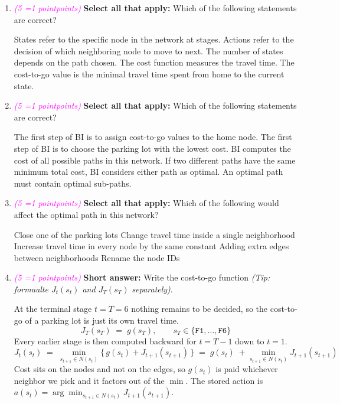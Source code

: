 \documentclass[11pt, letter, answers]{exam}
\newcommand{\grade}[1]{
    \small\textcolor{magenta}{\emph{(#1 \ifnum#1=1 point\else points\fi)}}%
    \normalsize
}
\newcommand{\sAll}{\textbf{Select all that apply: }}
\newcommand{\saq}{\textbf{Short answer: }}
\begin{document}
\begin{enumerate}[label=(\alph*)]

\item \grade{5} \sAll Which of the following statements are correct?
{
\checkboxchar{$\Box$} \checkedchar{$\blacksquare$}  %
\begin{checkboxes}
    \CorrectChoice States refer to the specific node in the network at stages.
    \CorrectChoice Actions refer to the decision of which neighboring node to move to next.
    \choice The number of states depends on the path chosen.
    \CorrectChoice The cost function measures the travel time.
    \choice The cost-to-go value is the minimal travel time spent from home to the current state.
\end{checkboxes}
}


\item \grade{5} \sAll Which of the following statements are correct?
{
\checkboxchar{$\Box$} \checkedchar{$\blacksquare$}  %
\begin{checkboxes}
    \choice The first step of BI is to assign cost-to-go values to the home node.
    \choice The first step of BI is to choose the parking lot with the lowest cost.
    \choice BI computes the cost of all possible paths in this network.
    \CorrectChoice If two different paths have the same minimum total cost, BI considers either path as optimal.
    \CorrectChoice An optimal path must contain optimal sub-paths.
\end{checkboxes}
}


\item \grade{5} \sAll Which of the following would affect the optimal path in this network?
{
\checkboxchar{$\Box$} \checkedchar{$\blacksquare$}  %
\begin{checkboxes}
    \CorrectChoice Close one of the parking lots
    \CorrectChoice Change travel time inside a single neighborhood
    \choice Increase travel time in every node by the same constant
    \CorrectChoice Adding extra edges between neighborhoods
    \choice Rename the node IDs
\end{checkboxes}
}


\item \grade{5} \saq Write the cost-to-go function \textit{(Tip: formualte $J_t(s_t)$ and $J_T(s_T)$ separately)}.
\begin{answerBox}[height=1.6in]
At the terminal stage $t=T=6$ nothing remains to be decided, so the cost-to-go of a parking lot is just its own travel time.
\[ J_T(s_T) \;=\; g(s_T), \qquad s_T \in \{\texttt{F1},\dots,\texttt{F6}\} \]
Every earlier stage is then computed backward for $t = T-1$ down to $t = 1$.
\[ J_t(s_t) \;=\; \min_{s_{t+1}\in N(s_t)}\bigl\{\, g(s_t) + J_{t+1}(s_{t+1}) \,\bigr\} \;=\; g(s_t) \;+ \min_{s_{t+1}\in N(s_t)} J_{t+1}(s_{t+1}) \]
Cost sits on the nodes and not on the edges, so $g(s_t)$ is paid whichever neighbor we pick and it factors out of the $\min$. The stored action is $a(s_t) = \arg\min_{s_{t+1}\in N(s_t)} J_{t+1}(s_{t+1})$.
\end{answerBox}



\end{enumerate}
\end{document}
